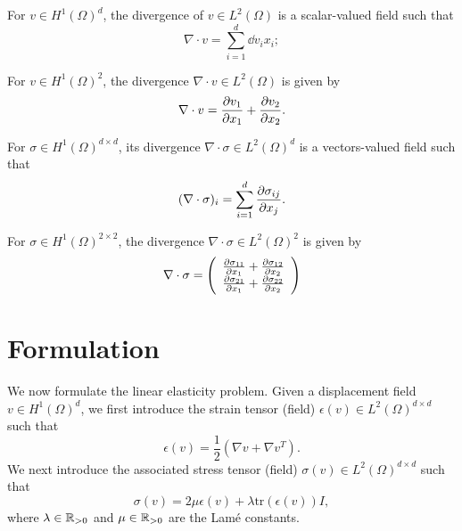 \begin{definition}
For $v \in H^1(\Omega)^d$, the divergence of $v \in L^2(\Omega)$ is a scalar-valued field such that
\begin{equation*}
  \nabla \cdot v = \sum_{i = 1}^d \dd{v_i}{x_i};
\end{equation*}
\end{definition}
\begin{corollary}
  For $v \in H^1(\Omega)^2$, the divergence $\nabla \cdot v \in L^2(\Omega)$ is given by
\begin{equation*}
  \nabla \cdot v = \pp{v_1}{x_1} + \pp{v_2}{x_2}.
\end{equation*}
\end{corollary}
\begin{definition}
For $\sigma \in H^1(\Omega)^{d \times d}$, its divergence $\nabla \cdot \sigma \in L^2(\Omega)^d$ is a vectors-valued field such that
\begin{equation*}
  (\nabla \cdot \sigma)_i = \sum_{i=1}^d \pp{\sigma_{ij}}{x_j}.
\end{equation*}
\end{definition}
\begin{corollary}
  For $\sigma \in H^1(\Omega)^{2 \times 2}$, the divergence $\nabla \cdot \sigma \in L^2(\Omega)^2$ is given by
  \begin{equation*}
    \nabla \cdot \sigma =
    \bmat{c}
    \pp{\sigma_{11}}{x_1} + \pp{\sigma_{12}}{x_2} \\
    \pp{\sigma_{21}}{x_1} + \pp{\sigma_{22}}{x_2}
    \emat
  \end{equation*}
\end{corollary}
\section{Formulation}
We now formulate the linear elasticity problem.  Given a displacement field $v \in H^1(\Omega)^d$, we first introduce the strain tensor (field) $\epsilon(v) \in L^2(\Omega)^{d \times d}$ such that
\begin{equation*}
  \epsilon(v) = \frac{1}{2} (\nabla v + \nabla v^T).
\end{equation*}
We next introduce the associated stress tensor (field) $\sigma(v) \in L^2(\Omega)^{d \times d}$ such that
\begin{equation*}
  \sigma(v) = 2 \mu \epsilon(v) + \lambda \text{tr}(\epsilon(v)) I,
\end{equation*}
where $\lambda \in \RR_{>0}$ and $\mu \in \RR_{>0}$ are the Lam\'e constants.

